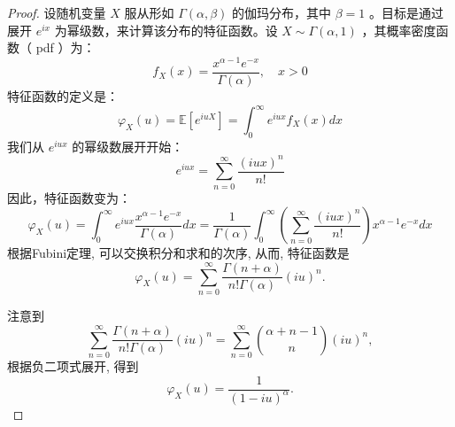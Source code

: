 \documentclass[UTF8, a4paper]{article}
\begin{document}
\begin{proof}

设随机变量 $X$ 服从形如 $\Gamma(\alpha, \beta)$ 的伽玛分布，其中 $\beta=1$ 。目标是通过展开 $e^{i x}$ 为幂级数，来计算该分布的特征函数。设 $X \sim \Gamma(\alpha, 1)$ ，其概率密度函数（ pdf ）为：
$$
f_X(x)=\frac{x^{\alpha-1} e^{-x}}{\Gamma(\alpha)}, \quad x>0
$$
特征函数的定义是：
$$
\varphi_X(u)=\mathbb{E}\left[e^{i u X}\right]=\int_0^{\infty} e^{i u x} f_X(x) d x
$$
我们从 $e^{i u x}$ 的幂级数展开开始：
$$
e^{i u x}=\sum_{n=0}^{\infty} \frac{(i u x)^n}{n!}
$$
因此，特征函数变为：
$$
\varphi_X(u)=\int_0^{\infty} e^{i u x} \frac{x^{\alpha-1} e^{-x}}{\Gamma(\alpha)} d x=\frac{1}{\Gamma(\alpha)} \int_0^{\infty}\left(\sum_{n=0}^{\infty} \frac{(i u x)^n}{n!}\right) x^{\alpha-1} e^{-x} d x
$$
根据Fubini定理, 可以交换积分和求和的次序, 从而, 特征函数是
$$
\varphi_X(u) = \sum_{n=0}^{\infty} \frac{\Gamma(n+\alpha)}{n!\Gamma(\alpha)}(i u)^n.
$$



注意到
$$
\sum_{n=0}^{\infty} \frac{\Gamma(n+\alpha)}{n!\Gamma(\alpha)}(i u)^n = \sum_{n=0}^{\infty}\binom{\alpha+n-1}{n}(i u)^n, 
$$
根据负二项式展开, 得到
$$
\varphi_X(u) = \frac{1}{(1-iu)^\alpha}.
$$

\end{proof}




\end{document}
